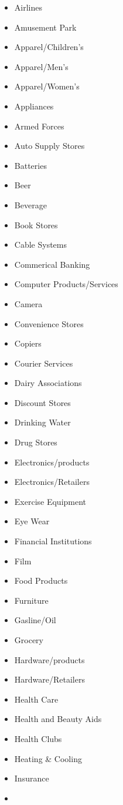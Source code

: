 \documentclass[
]{book}
\providecommand{\tightlist}{%
  \setlength{\itemsep}{0pt}\setlength{\parskip}{0pt}}
\begin{document}
\begin{itemize}
\tightlist
\item
  Airlines
\item
  Amusement Park
\item
  Apparel/Children's
\item
  Apparel/Men's
\item
  Apparel/Women's
\item
  Appliances
\item
  Armed Forces
\item
  Auto Supply Stores
\item
  Batteries
\item
  Beer
\item
  Beverage
\item
  Book Stores
\item
  Cable Systems
\item
  Commerical Banking
\item
  Computer Products/Services
\item
  Camera
\item
  Convenience Stores
\item
  Copiers
\item
  Courier Services
\item
  Dairy Associations
\item
  Discount Stores
\item
  Drinking Water
\item
  Drug Stores
\item
  Electronics/products
\item
  Electronics/Retailers
\item
  Exercise Equipment
\item
  Eye Wear
\item
  Financial Institutions
\item
  Film
\item
  Food Products
\item
  Furniture
\item
  Gasline/Oil
\item
  Grocery
\item
  Hardware/products
\item
  Hardware/Retailers
\item
  Health Care
\item
  Health and Beauty Aids
\item
  Health Clubs
\item
  Heating \& Cooling
\item
  Insurance
\item

\end{itemize}
\end{document}
